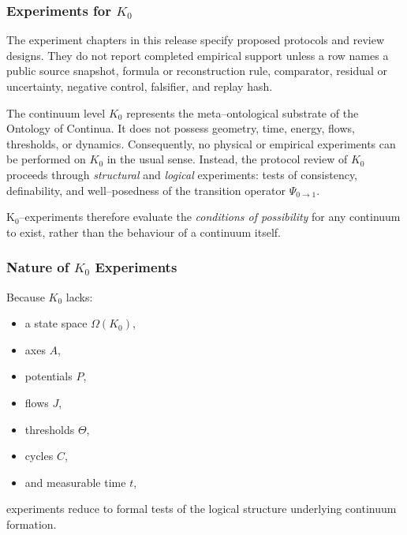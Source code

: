 
\subsubsection{Experiments for \texorpdfstring{$K_0$}{K_0}}

The experiment chapters in this release specify proposed protocols and review designs. They do not report completed empirical support unless a row names a public source snapshot, formula or reconstruction rule, comparator, residual or uncertainty, negative control, falsifier, and replay hash.
\label{sec:experiments-k0}

The continuum level $K_0$ represents the meta–ontological substrate of the
Ontology of Continua.
It does not possess geometry, time, energy, flows, thresholds, or dynamics.
Consequently, no physical or empirical experiments can be performed on $K_0$
in the usual sense.
Instead, the protocol review of $K_0$ proceeds through \emph{structural} and
\emph{logical} experiments: tests of consistency, definability, and
well–posedness of the transition operator $\Psi_{0\to 1}$.

K$_0$–experiments therefore evaluate the \emph{conditions of possibility} for
any continuum to exist, rather than the behaviour of a continuum itself.


\subsubsection{Nature of \texorpdfstring{$K_0$}{K_0} Experiments}

Because $K_0$ lacks:
\begin{itemize}
    \item a state space $\Omega(K_0)$,
    \item axes $A$,
    \item potentials $P$,
    \item flows $J$,
    \item thresholds $\Theta$,
    \item cycles $C$,
    \item and measurable time $t$,
\end{itemize}
experiments reduce to formal tests of the logical structure underlying
continuum formation.

